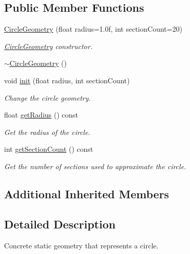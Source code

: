 \subsection*{Public Member Functions}
\begin{DoxyCompactItemize}
\item 
\mbox{\hyperlink{classec_1_1_circle_geometry_addbe5d69b86093eb1002638e24f2de18}{Circle\+Geometry}} (float radius=1.\+0f, int section\+Count=20)
\begin{DoxyCompactList}\small\item\em \mbox{\hyperlink{classec_1_1_circle_geometry}{Circle\+Geometry}} constructor. \end{DoxyCompactList}\item 
\mbox{\hyperlink{classec_1_1_circle_geometry_a1cba969c53a5379e281c720883d932e7}{$\sim$\+Circle\+Geometry}} ()
\item 
void \mbox{\hyperlink{classec_1_1_circle_geometry_aef6ab090302b5370c4369ec3f806f98e}{init}} (float radius, int section\+Count)
\begin{DoxyCompactList}\small\item\em Change the circle geometry. \end{DoxyCompactList}\item 
float \mbox{\hyperlink{classec_1_1_circle_geometry_a7926a1f020f9b4998e0d4be0912b7b80}{get\+Radius}} () const
\begin{DoxyCompactList}\small\item\em Get the radius of the circle. \end{DoxyCompactList}\item 
int \mbox{\hyperlink{classec_1_1_circle_geometry_a68648b12d6d2d7ffaf39d141f758e22b}{get\+Section\+Count}} () const
\begin{DoxyCompactList}\small\item\em Get the number of sections used to approximate the circle. \end{DoxyCompactList}\end{DoxyCompactItemize}
\subsection*{Additional Inherited Members}


\subsection{Detailed Description}
Concrete static geometry that represents a circle. 


